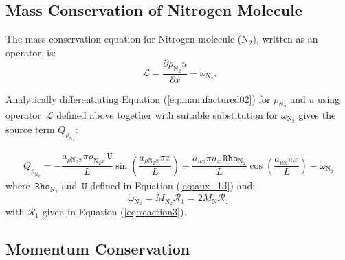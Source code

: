 \documentclass[10pt]{article}
\newcommand{\diff}[2] {\dfrac{\partial #1 }{\partial #2}}
\newcommand{\Lo}{\,\mathcal{L}}
\newcommand{\Rho}{\,\mathtt{Rho}}
\newcommand{\U}{\,\mathtt{U}}
\newcommand{\N}{\text{N}}
\begin{document}
\subsection{Mass Conservation of Nitrogen Molecule}

The mass conservation equation for Nitrogen molecule ($\text{N}_2$), written as an operator, is:
\begin{equation*}
 \label{eq:euler1d_11a}
\Lo =  \diff{\rho_{\text{N}_2} u }{x} - \dot{\omega}_{\text{N}_2}.
\end{equation*}

Analytically differentiating Equation (\ref{eq:manufactured02}) for $\rho_{\text{N}_2}$ and $u$ using operator $\Lo$ defined above together with suitable substitution for $\dot{\omega}_{\text{N}_2}$ gives the source term $Q_{\rho_{\text{N}_2}}$:

\begin{equation}
\begin{split}
Q_{\rho_{\N_2}} = -\dfrac{a_{  \rho \N_2 x } \pi \rho_{\N_2 x} \U }{L}\sin\left(\dfrac{a_{  \rho \N_2 x } \pi x}{L}\right) +\dfrac{a_{ux} \pi u_x \Rho_{\N_2}}{L} \cos\left(\dfrac{a_{ux} \pi x}{L}\right) -\dot{\omega}_{\N_2}
\end{split}
\end{equation}
where $\Rho_{\N_2}$ and $\U$ defined in Equation (\ref{eq:aux_1d}) and:
$$
\dot{\omega}_{\N_2} =  M_{\N_2} \mathcal{R}_1	= 2 M_\N \mathcal{R}_1	
$$
with  $\mathcal{R}_1$ given in Equation (\ref{eq:reaction3}).


\subsection{Momentum Conservation}
\end{document}
